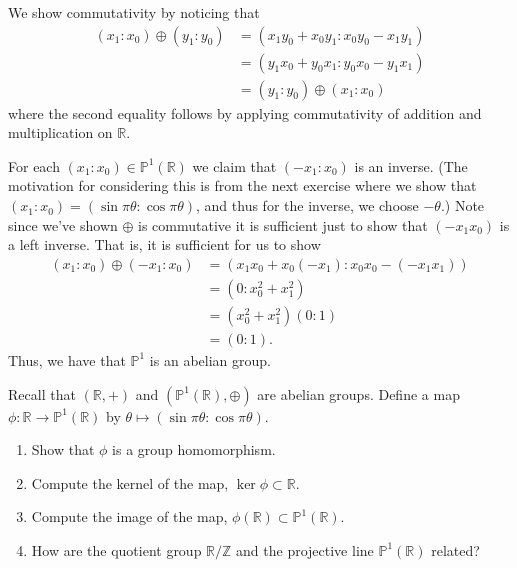 \documentclass[12 pt, letterpaper]{hmcpset}
\begin{document}
\begin{solution}
\begin{enumerate}
			We show commutativity by noticing that
			\[
				\begin{split}
					(x_{1} : x_{0}) \oplus (y_{1} : y_{0}) & = (x_{1} y_{0} + x_{0} y_{1} : x_{0} y_{0} - x_{1} y_{1}) \\
									       & = (y_{1} x_{0} + y_{0} x_{1} : y_{0} x_{0} - y_{1} x_{1}) \\
									       & = (y_{1} : y_{0}) \oplus (x_{1} : x_{0})
				\end{split}
			\]
			where the second equality follows by applying commutativity of addition and multiplication on $\mathbb{R}$.

			For each $(x_{1} : x_{0}) \in \mathbb{P}^{1}(\mathbb{R})$ we claim that $(- x_{1} : x_{0})$ is an inverse. (The motivation for considering this is from the next exercise where we show that $(x_{1} : x_{0}) = (\sin{\pi \theta} : \cos{\pi \theta})$, and thus for the inverse, we choose $- \theta$.) Note since we've shown $\oplus$ is commutative it is sufficient just to show that $(-x_{1} x_{0})$ is a left inverse. That is, it is sufficient for us to show
			\[
				\begin{split}
					(x_{1} : x_{0}) \oplus (- x_{1} : x_{0}) & = (x_{1} x_{0} + x_{0} (- x_{1}) : x_{0} x_{0} - (- x_{1} x_{1}) ) \\
										 & = (0 : x_{0}^{2} + x_{1}^{2}) \\
										 & = (x_{0}^{2} + x_{1}^{2}) (0 : 1) \\
										 & = (0 : 1).
				\end{split}
			\]
			Thus, we have that $\mathbb{P}^{1}$ is an abelian group.
	\end{enumerate}
\end{solution}

\pagebreak

\begin{problem}[Problem 3.]
	Recall that $(\mathbb{R}, +)$ and $(\mathbb{P}^{1}(\mathbb{R}), \oplus)$ are abelian groups. Define a map $\phi : \mathbb{R} \to \mathbb{P}^{1}(\mathbb{R})$ by $\theta \mapsto (\sin{\pi \theta} : \cos{\pi \theta})$.
	\begin{enumerate}
		\item Show that $\phi$ is a group homomorphism.
		\item Compute the kernel of the map, $\ker \phi \subset \mathbb{R}$.
		\item Compute the image of the map,  $\phi(\mathbb{R}) \subset \mathbb{P}^{1}(\mathbb{R})$.
		\item How are the quotient group $\mathbb{R} / \mathbb{Z}$ and the projective line $\mathbb{P}^{1}(\mathbb{R})$ related?
	\end{enumerate}
\end{problem}
\end{document}
